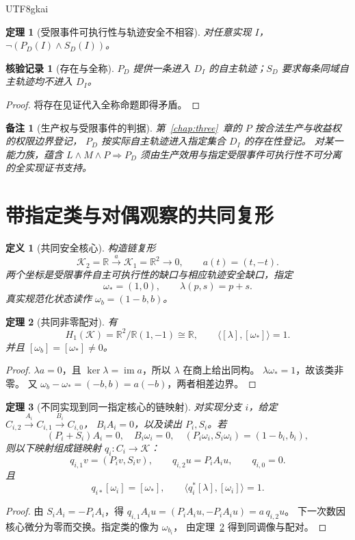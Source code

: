 \documentclass[12pt,a4paper,openany]{report}
\newtheorem{definition}{定义}[chapter]
\newtheorem{theorem}{定理}[chapter]
\newtheorem{remark}{备注}[chapter]
\newtheorem{Certificate}{核验记录}[chapter]
\numberwithin{equation}{chapter}
\newcommand{\RR}{\mathbb R}
\newcommand{\im}{\operatorname{im}}
\begin{document}
\begin{CJK*}{UTF8}{gkai}
\begin{theorem}[受限事件可执行性与轨迹安全不相容]
对任意实现 $I$，$\neg(P_D(I)\land S_D(I))$。
\end{theorem}
\begin{Certificate}[存在与全称]
$P_D$ 提供一条进入 $D_I$ 的自主轨迹；$S_D$ 要求每条同域自主轨迹均不进入 $D_I$。
\end{Certificate}
\begin{proof}
将存在见证代入全称命题即得矛盾。
\end{proof}

\begin{remark}[生产权与受限事件的判据]
第~\ref{chap:three}~章的 $P$ 按合法生产与收益权的权限边界登记，
$P_D$ 按实际自主轨迹进入指定集合 $D_I$ 的存在性登记。
对某一能力族，蕴含 $L\land M\land P\Rightarrow P_D$
须由生产效用与指定受限事件可执行性不可分离的全实现证书支持。
\end{remark}

\section{带指定类与对偶观察的共同复形}

\begin{definition}[共同安全核心]
\label{def:safety-core}
构造链复形
\[
 \mathcal K_2=\RR\xrightarrow{a}\mathcal K_1=\RR^2\longrightarrow0,
 \qquad a(t)=(t,-t).
\]
两个坐标是受限事件自主可执行性的缺口与相应轨迹安全缺口，指定
\[
 \omega_*=(1,0),\qquad \lambda(p,s)=p+s.
\]
真实规范化状态读作 $\omega_b=(1-b,b)$。
\end{definition}

\begin{theorem}[共同非零配对]
\label{thm:safety-pairing}
有
\[
 H_1(\mathcal K)=\RR^2/\RR(1,-1)\cong\RR,\qquad
 \langle[\lambda],[\omega_*]\rangle=1.
\]
并且 $[\omega_b]=[\omega_*]\ne0$。
\end{theorem}
\begin{proof}
$\lambda a=0$，且 $\ker\lambda=\im a$，所以 $\lambda$ 在商上给出同构。
$\lambda\omega_*=1$，故该类非零。
又 $\omega_b-\omega_*=(-b,b)=a(-b)$，两者相差边界。
\end{proof}

\begin{theorem}[不同实现到同一指定核心的链映射]
\label{thm:shared-core}
对实现分支 $i$，给定 $C_{i,2}\xrightarrow{A_i}C_{i,1}\xrightarrow{B_i}C_{i,0}$，
$B_iA_i=0$，以及读出 $P_i,S_i$。若
\[
 (P_i+S_i)A_i=0,\quad B_i\omega_i=0,\quad
 (P_i\omega_i,S_i\omega_i)=(1-b_i,b_i),
\]
则以下映射组成链映射 $q_i:C_i\to\mathcal K$：
\[
 q_{i,1}v=(P_iv,S_iv),\qquad q_{i,2}u=P_iA_iu,\qquad q_{i,0}=0.
\]
且
\[
 q_{i*}[\omega_i]=[\omega_*],\qquad
 \langle q_i^*[\lambda],[\omega_i]\rangle=1.
\]
\end{theorem}
\begin{proof}
由 $S_iA_i=-P_iA_i$，得
$q_{i,1}A_iu=(P_iA_iu,-P_iA_iu)=a\,q_{i,2}u$。
下一次数因核心微分为零而交换。指定类的像为 $\omega_{b_i}$，
由定理~\ref{thm:safety-pairing} 得到同调像与配对。
\end{proof}


\end{CJK*}
\end{document}
